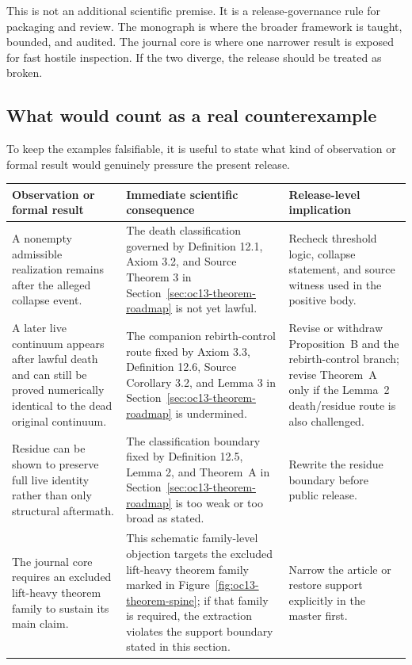 This is not an additional scientific premise. It is a release-governance rule for packaging and review. The
monograph is where the broader framework is taught, bounded, and audited. The journal core is
where one narrower result is exposed for fast hostile inspection. If the two diverge, the release
should be treated as broken.

\subsection{What would count as a real counterexample}

To keep the examples falsifiable, it is useful to state what kind of observation or formal result
would genuinely pressure the present release.

\begin{table}[htbp]
\centering
\begingroup
\footnotesize
\RaggedRight
\setlength{\tabcolsep}{4pt}
\begin{tabular}{@{}L{0.27\textwidth}L{0.36\textwidth}L{0.22\textwidth}@{}}
\toprule
\textbf{Observation or formal result} & \textbf{Immediate scientific consequence} & \textbf{Release-level implication} \\
\midrule
A nonempty admissible realization remains after the alleged collapse event. & The death classification governed by Definition 12.1, Axiom 3.2, and Source Theorem 3 in Section~\ref{sec:oc13-theorem-roadmap} is not yet lawful. & Recheck threshold logic, collapse statement, and source witness used in the positive body. \\
A later live continuum appears after lawful death and can still be proved numerically identical to the dead original continuum. & The companion rebirth-control route fixed by Axiom 3.3, Definition 12.6, Source Corollary 3.2, and Lemma 3 in Section~\ref{sec:oc13-theorem-roadmap} is undermined. & Revise or withdraw Proposition~B and the rebirth-control branch; revise Theorem~A only if the Lemma~2 death/residue route is also challenged. \\
Residue can be shown to preserve full live identity rather than only structural aftermath. & The classification boundary fixed by Definition 12.5, Lemma 2, and Theorem~A in Section~\ref{sec:oc13-theorem-roadmap} is too weak or too broad as stated. & Rewrite the residue boundary before public release. \\
The journal core requires an excluded lift-heavy theorem family to sustain its main claim. & This schematic family-level objection targets the excluded lift-heavy theorem family marked in Figure~\ref{fig:oc13-theorem-spine}; if that family is required, the extraction violates the support boundary stated in this section. & Narrow the article or restore support explicitly in the master first. \\

\end{tabular}
\end{table}
